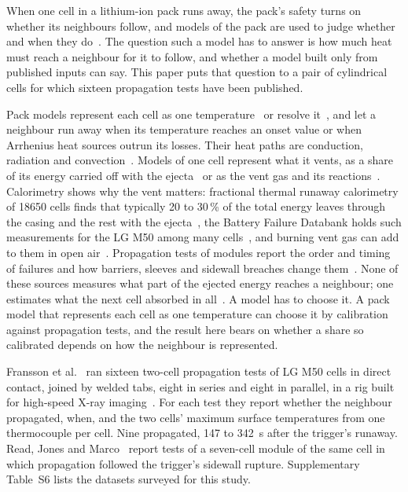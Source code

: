 \documentclass[preprint,12pt]{elsarticle}
\begin{document}
When one cell in a lithium-ion pack runs away, the pack's safety turns on whether its neighbours follow, and models of the pack are used to judge whether and when they do~\cite{feng2015propagation,coman2017modelling,mishra2021multimode,hoelle2023simulation}. The question such a model has to answer is how much heat must reach a neighbour for it to follow, and whether a model built only from published inputs can say. This paper puts that question to a pair of cylindrical cells for which sixteen propagation tests have been published.

Pack models represent each cell as one temperature~\cite{feng2015propagation} or resolve it~\cite{mishra2021multimode,hoelle2023simulation}, and let a neighbour run away when its temperature reaches an onset value or when Arrhenius heat sources outrun its losses. Their heat paths are conduction, radiation and convection~\cite{mishra2021multimode}. Models of one cell represent what it vents, as a share of its energy carried off with the ejecta~\cite{coman2017modelling} or as the vent gas and its reactions~\cite{kim2021venting}. Calorimetry shows why the vent matters: fractional thermal runaway calorimetry of 18650 cells finds that typically 20 to 30\,\% of the total energy leaves through the casing and the rest with the ejecta~\cite{walker2019decoupling}, the Battery Failure Databank holds such measurements for the LG M50 among many cells~\cite{finegan2024databank}, and burning vent gas can add to them in open air~\cite{vendra2022numerical,chen2020experimental}. Propagation tests of modules report the order and timing of failures and how barriers, sleeves and sidewall breaches change them~\cite{lamb2015failure,said2019cascading,torrescastro2020passive,read2024barrier,schoberl2024propagation,allen2025sleeves}. None of these sources measures what part of the ejected energy reaches a neighbour; one estimates what the next cell absorbed in all~\cite{torrescastro2020passive}. A model has to choose it. A pack model that represents each cell as one temperature can choose it by calibration against propagation tests, and the result here bears on whether a share so calibrated depends on how the neighbour is represented.

Fransson et al.~\cite{fransson2024exploring} ran sixteen two-cell propagation tests of LG M50 cells in direct contact, joined by welded tabs, eight in series and eight in parallel, in a rig built for high-speed X-ray imaging~\cite{pfaff2023insitu}. For each test they report whether the neighbour propagated, when, and the two cells' maximum surface temperatures from one thermocouple per cell. Nine propagated, 147 to 342~s after the trigger's runaway. Read, Jones and Marco~\cite{read2024sidewall} report tests of a seven-cell module of the same cell in which propagation followed the trigger's sidewall rupture. Supplementary Table~S6 lists the datasets surveyed for this study.
\end{document}
